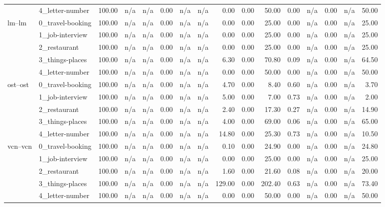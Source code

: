 \begin{tabular}{llrrrrrrrrrrrrrr}
 & 4_letter-number & 100.00 & n/a & n/a & 0.00 & n/a & n/a & 0.00 & 0.00 & 50.00 & 0.00 & n/a & 0.00 & n/a & 50.00 \\
\cline{1-16}
\multirow[t]{5}{*}{lm--lm} & 0_travel-booking & 100.00 & n/a & n/a & 0.00 & n/a & n/a & 0.00 & 0.00 & 25.00 & 0.00 & n/a & 0.00 & n/a & 25.00 \\
 & 1_job-interview & 100.00 & n/a & n/a & 0.00 & n/a & n/a & 0.00 & 0.00 & 25.00 & 0.00 & n/a & 0.00 & n/a & 25.00 \\
 & 2_restaurant & 100.00 & n/a & n/a & 0.00 & n/a & n/a & 0.00 & 0.00 & 25.00 & 0.00 & n/a & 0.00 & n/a & 25.00 \\
 & 3_things-places & 100.00 & n/a & n/a & 0.00 & n/a & n/a & 6.30 & 0.00 & 70.80 & 0.09 & n/a & 0.00 & n/a & 64.50 \\
 & 4_letter-number & 100.00 & n/a & n/a & 0.00 & n/a & n/a & 0.00 & 0.00 & 50.00 & 0.00 & n/a & 0.00 & n/a & 50.00 \\
\cline{1-16}
\multirow[t]{5}{*}{ost--ost} & 0_travel-booking & 100.00 & n/a & n/a & 0.00 & n/a & n/a & 4.70 & 0.00 & 8.40 & 0.60 & n/a & 0.00 & n/a & 3.70 \\
 & 1_job-interview & 100.00 & n/a & n/a & 0.00 & n/a & n/a & 5.00 & 0.00 & 7.00 & 0.73 & n/a & 0.00 & n/a & 2.00 \\
 & 2_restaurant & 100.00 & n/a & n/a & 0.00 & n/a & n/a & 2.40 & 0.00 & 17.30 & 0.27 & n/a & 0.00 & n/a & 14.90 \\
 & 3_things-places & 100.00 & n/a & n/a & 0.00 & n/a & n/a & 4.00 & 0.00 & 69.00 & 0.06 & n/a & 0.00 & n/a & 65.00 \\
 & 4_letter-number & 100.00 & n/a & n/a & 0.00 & n/a & n/a & 14.80 & 0.00 & 25.30 & 0.73 & n/a & 0.00 & n/a & 10.50 \\
\cline{1-16}
\multirow[t]{5}{*}{vcn--vcn} & 0_travel-booking & 100.00 & n/a & n/a & 0.00 & n/a & n/a & 0.10 & 0.00 & 24.90 & 0.00 & n/a & 0.00 & n/a & 24.80 \\
 & 1_job-interview & 100.00 & n/a & n/a & 0.00 & n/a & n/a & 0.00 & 0.00 & 25.00 & 0.00 & n/a & 0.00 & n/a & 25.00 \\
 & 2_restaurant & 100.00 & n/a & n/a & 0.00 & n/a & n/a & 1.60 & 0.00 & 21.60 & 0.08 & n/a & 0.00 & n/a & 20.00 \\
 & 3_things-places & 100.00 & n/a & n/a & 0.00 & n/a & n/a & 129.00 & 0.00 & 202.40 & 0.63 & n/a & 0.00 & n/a & 73.40 \\
 & 4_letter-number & 100.00 & n/a & n/a & 0.00 & n/a & n/a & 0.00 & 0.00 & 50.00 & 0.00 & n/a & 0.00 & n/a & 50.00 \\
\cline{1-16}
\bottomrule
\end{tabular}
